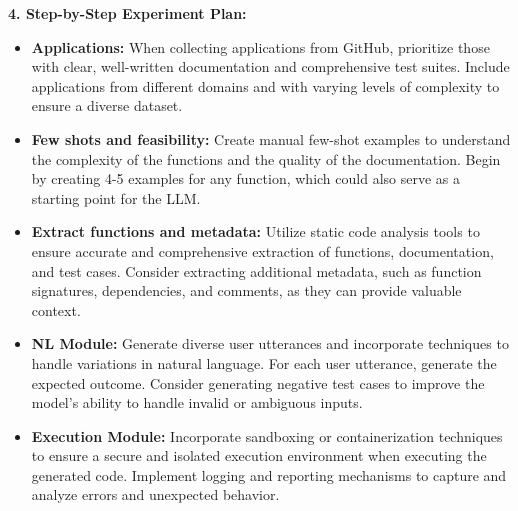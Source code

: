 \begin{tcolorbox}[colback=blue!5!white,colframe=blue!75!black,title=\textbf{Autoprompting: Generate Diverse Few-Shot Examples for Any Application (Part 1)}]
{\textbf{4. Step-by-Step Experiment Plan:}
\begin{itemize}
    \item \textbf{Applications:} When collecting applications from GitHub, prioritize those with clear, well-written documentation and comprehensive test suites. Include applications from different domains and with varying levels of complexity to ensure a diverse dataset.
    \item \textbf{Few shots and feasibility:} Create manual few-shot examples to understand the complexity of the functions and the quality of the documentation. Begin by creating 4-5 examples for any function, which could also serve as a starting point for the LLM.
    \item \textbf{Extract functions and metadata:} Utilize static code analysis tools to ensure accurate and comprehensive extraction of functions, documentation, and test cases. Consider extracting additional metadata, such as function signatures, dependencies, and comments, as they can provide valuable context.
    \item \textbf{NL Module:} Generate diverse user utterances and incorporate techniques to handle variations in natural language. For each user utterance, generate the expected outcome. Consider generating negative test cases to improve the model's ability to handle invalid or ambiguous inputs.
    \item \textbf{Execution Module:} Incorporate sandboxing or containerization techniques to ensure a secure and isolated execution environment when executing the generated code. Implement logging and reporting mechanisms to capture and analyze errors and unexpected behavior.
\end{itemize}
}
\end{tcolorbox}

\newpage

